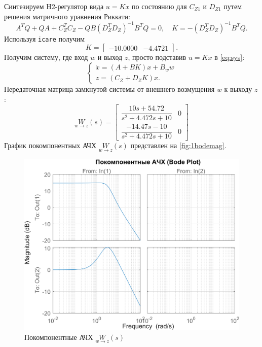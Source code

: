 Синтезируем H2-регулятор вида $u=Kx$ по состоянию для $C_{Z1}$ и $D_{Z1}$ путем решения матричного
уравнения Риккати:
\begin{equation}
    \label{eq:ric1}
    A^TQ+QA+C_Z^TC_Z-QB(D_Z^TD_Z)^{-1}B^TQ=0,\quad K=-(D_Z^TD_Z)^{-1}B^TQ.
\end{equation}
Используя \texttt{icare} получим
\begin{equation*}
    K=\begin{bmatrix}
        -10.0000&-4.4721
    \end{bmatrix}.
\end{equation*}
Получим систему, где вход $w$ и выход $z$, просто подставив $u=Kx$ в \eqref{eq:sys}:
\begin{equation*}
    \begin{cases}
        \dot x=(A+BK)x+B_ww\\
        z=(C_Z+D_ZK)x.
    \end{cases}
\end{equation*}
Передаточная матрица замкнутой системы от внешнего возмущения $w$ к выходу $z$:
\begin{equation*}
    \underset{w\rightarrow z}{W}(s)=\begin{bmatrix}
        \dfrac{10s+54.72}{s^2+4.472s+10} & 0 \\[2ex]
        \dfrac{-14.47s-10}{s^2+4.472s+10} & 0
    \end{bmatrix}
\end{equation*}
График покомпонентных АЧХ $\underset{w\rightarrow z}{W}(s)$ представлен на \autoref{fig:1bodemag}.
\begin{figure}[H]
    \centering
    \includegraphics[width=0.8\linewidth]{figs/1_bodemag.png}
    \caption{Покомпонентные АЧХ $\underset{w\rightarrow z}{W}(s)$}
    \label{fig:1bodemag}
\end{figure}
